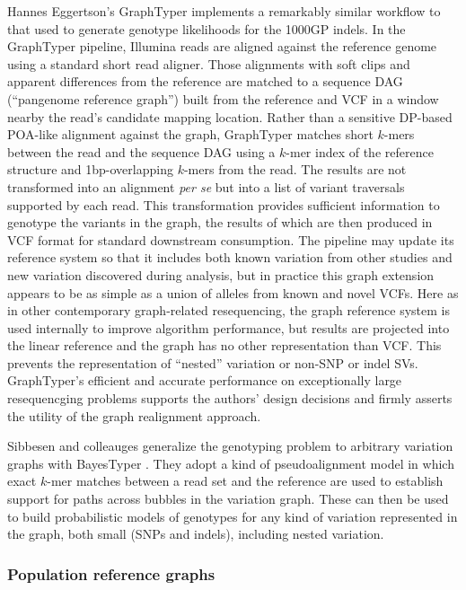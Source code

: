 Hannes Eggertson's GraphTyper \cite{eggertsson2017graphtyper} implements a remarkably similar workflow to that used to generate genotype likelihoods for the 1000GP indels.
In the GraphTyper pipeline, Illumina reads are aligned against the reference genome using a standard short read aligner.
Those alignments with soft clips and apparent differences from the reference are matched to a sequence DAG (``pangenome reference graph'') built from the reference and VCF in a window nearby the read's candidate mapping location.
Rather than a sensitive DP-based POA-like alignment against the graph, GraphTyper matches short $k$-mers between the read and the sequence DAG using a $k$-mer index of the reference structure and 1bp-overlapping $k$-mers from the read.
The results are not transformed into an alignment \emph{per se} but into a list of variant traversals supported by each read.
This transformation provides sufficient information to genotype the variants in the graph, the results of which are then produced in VCF format for standard downstream consumption.
The pipeline may update its reference system so that it includes both known variation from other studies and new variation discovered during analysis, but in practice this graph extension appears to be as simple as a union of alleles from known and novel VCFs.
Here as in other contemporary graph-related resequencing, the graph reference system is used internally to improve algorithm performance, but results are projected into the linear reference and the graph has no other representation than VCF.
This prevents the representation of ``nested'' variation or non-SNP or indel SVs.
GraphTyper's efficient and accurate performance on exceptionally large resequencging problems supports the authors' design decisions and firmly asserts the utility of the graph realignment approach.

Sibbesen and colleauges generalize the genotyping problem to arbitrary variation graphs with BayesTyper \cite{sibbesen2018accurate}.
They adopt a kind of pseudoalignment model in which exact $k$-mer matches between a read set and the reference are used to establish support for paths across bubbles in the variation graph.
These can then be used to build probabilistic models of genotypes for any kind of variation represented in the graph, both small (SNPs and indels), including nested variation.

\subsubsection{Population reference graphs}

